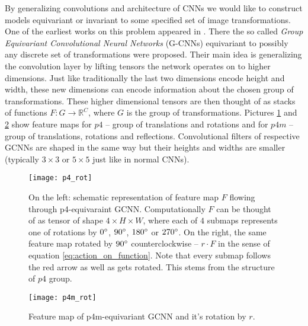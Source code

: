    By generalizing convolutions and architecture of CNNs we would like to
    construct models
    equivariant or invariant to some specified set of image transformations.
    One of the earliest works on this problem appeared in \cite{cohen2016}. There
    the so called \textit{Group Equivariant Convolutional Neural Networks}
    (G-CNNs) equivariant to possibly any discrete set of transformations were
    proposed. Their main idea is generalizing the convolution layer by
    lifting tensors the network operates on to higher dimensions.
    Just like traditionally the last two
    dimensions encode height and width, these new dimensions can
    encode information about the chosen group of transformations. These higher
    dimensional tensors are then thought of as stacks of functions
    $F:G\to\mathbb{R}^C$, where $G$ is the group of transformations.
    Pictures \ref{fig:p4_rot} and \ref{fig:p4m_rot} show
    feature maps for $p4$ -- group of translations and rotations and for 
    $p4m$ -- group of
    translations, rotations and reflections.
    Convolutional filters of respective GCNNs are shaped in the same way
    but their heights and widths are smaller (typically $3\times3$ or $5\times5$
    just like in normal CNNs).
    \begin{figure}[h]
        \centering
        \texttt{[image: p4\_rot]}
        \caption{On the left: schematic representation of feature map $F$ flowing through
            p4-equivaraint GCNN. Computationally $F$ can be thought of as tensor of shape
            $4\times H \times W$, where each of $4$ submaps represents one of
            rotations by $0\degree$, $90\degree$, $180\degree$ or $270\degree$.
            On the right, the same feature map rotated by
            $90 \degree$ counterclockwise -- $r\cdot F$ in the sense of equation
            \ref{eq:action_on_function}. Note that every submap follows the
            red arrow as well as gets rotated. This stems from the structure of
            $p4$ group.}
        \label{fig:p4_rot}
    \end{figure}
    \begin{figure}[h]
        \centering
        \texttt{[image: p4m\_rot]}
        \caption{Feature map of p4m-equivariant GCNN and it's rotation by $r$.}
        \label{fig:p4m_rot}
    \end{figure}

